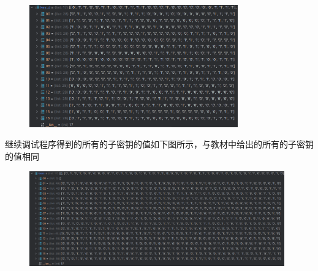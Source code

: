 \documentclass[a4paper,11pt,UTF8]{ctexart}
\newcommand{\bottomcaption}{%
\setlength{\abovecaptionskip}{6pt}%
\setlength{\belowcaptionskip}{6pt}%
\caption}
\newcommand{\xiaowuhao}{\fontsize{9pt}{\baselineskip}\selectfont}   %
\begin{document}
            \begin{figure}[H]
                \centering
                \includegraphics[width=9cm]{key_d.png}
                \bottomcaption{\xiaowuhao{调试程序得到所有的D的值}}
            \end{figure}
\newpage
            继续调试程序得到的所有的子密钥的值如下图所示，与教材中给出的所有的子密钥的值相同
            \begin{figure}[H]
                \centering
                \includegraphics[width=11cm]{keys.png}
                \bottomcaption{\xiaowuhao{调试程序得到所有的子密钥的值}}
            \end{figure}
\end{document}
